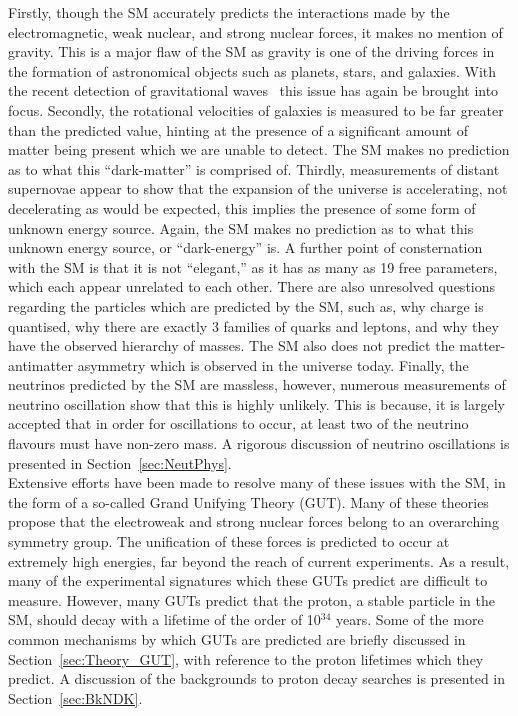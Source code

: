 Firstly, though the SM accurately predicts the interactions made by the electromagnetic, weak nuclear, and strong nuclear forces, it makes no mention of gravity. This is a major flaw of the SM as gravity is one of the driving forces in the formation of astronomical objects such as planets, stars, and galaxies. With the recent detection of gravitational waves~\citep{LIGO} this issue has again be brought into focus. Secondly, the rotational velocities of galaxies is measured to be far greater than the predicted value, hinting at the presence of a significant amount of matter being present which we are unable to detect. The SM makes no prediction as to what this ``dark-matter'' is comprised of. Thirdly, measurements of distant supernovae appear to show that the expansion of the universe is accelerating, not decelerating as would be expected, this implies the presence of some form of unknown energy source. Again, the SM makes no prediction as to what this unknown energy source, or ``dark-energy'' is. A further point of consternation with the SM is that it is not ``elegant,'' as it has as many as 19 free parameters, which each appear unrelated to each other. There are also unresolved questions regarding the particles which are predicted by the SM, such as, why charge is quantised, why there are exactly 3 families of quarks and leptons, and why they have the observed hierarchy of masses. The SM also does not predict the matter-antimatter asymmetry which is observed in the universe today. Finally, the neutrinos predicted by the SM are massless, however, numerous measurements of neutrino oscillation show that this is highly unlikely. This is because, it is largely accepted that in order for oscillations to occur, at least two of the neutrino flavours must have non-zero mass. A rigorous discussion of neutrino oscillations is presented in Section~\ref{sec:NeutPhys}. \\

Extensive efforts have been made to resolve many of these issues with the SM, in the form of a so-called Grand Unifying Theory (GUT). Many of these theories propose that the electroweak and strong nuclear forces belong to an overarching symmetry group. The unification of these forces is predicted to occur at extremely high energies, far beyond the reach of current experiments. As a result, many of the experimental signatures which these GUTs predict are difficult to measure. However, many GUTs predict that the proton, a stable particle in the SM, should decay with a lifetime of the order of 10$^{34}$ years. Some of the more common mechanisms by which GUTs are predicted are briefly discussed in Section~\ref{sec:Theory_GUT}, with reference to the proton lifetimes which they predict. A discussion of the backgrounds to proton decay searches is presented in Section~\ref{sec:BkNDK}. \\

